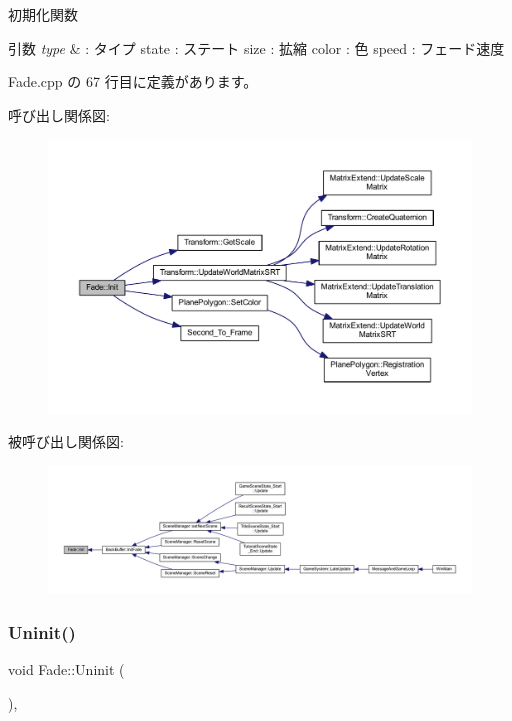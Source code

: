 初期化関数 


\begin{DoxyParams}{引数}
{\em type} & \+: タイプ state \+: ステート size \+: 拡縮 color \+: 色 speed \+: フェード速度 \\
\hline
\end{DoxyParams}


 Fade.\+cpp の 67 行目に定義があります。

呼び出し関係図\+:\nopagebreak
\begin{figure}[H]
\begin{center}
\leavevmode
\includegraphics[width=350pt]{class_fade_aab12848f7102a219968c86ed699a6e5d_cgraph}
\end{center}
\end{figure}
被呼び出し関係図\+:
\nopagebreak
\begin{figure}[H]
\begin{center}
\leavevmode
\includegraphics[width=350pt]{class_fade_aab12848f7102a219968c86ed699a6e5d_icgraph}
\end{center}
\end{figure}
\mbox{\label{class_fade_ae77d06811869d3c8162a42c3e0e14f7f}} 
\subsubsection{\texorpdfstring{Uninit()}{Uninit()}}
{\footnotesize\ttfamily void Fade\+::\+Uninit (\begin{DoxyParamCaption}{ }\end{DoxyParamCaption})\hspace{0.3cm}{\ttfamily [override]}, {\ttfamily [virtual]}}




